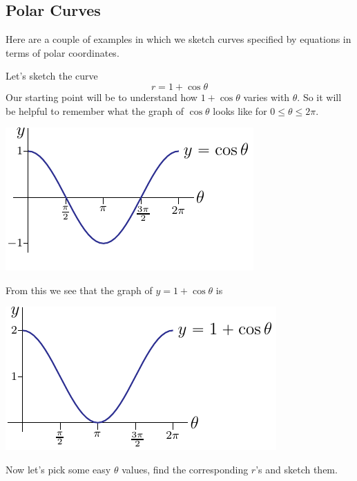 \subsection{Polar Curves} \label{sec polar curves}

Here are a couple of examples in which we sketch curves specified 
by equations in terms of polar coordinates.

\begin{eg}\label{eg cardioid}
Let's sketch the curve 
\begin{equation*}
r= 1+\cos\theta
\end{equation*}
Our starting point will be to understand how $1+\cos\theta$ varies with $\theta$.
So it will be helpful to 
remember what the graph of $\cos\theta$ looks like for $0\le\theta\le 2\pi$.
\begin{efig}
\begin{center}
    \includegraphics{cosGraph.pdf}
\end{center}
\end{efig}
From this we see that the graph of $y=1+\cos\theta$ is 
\begin{efig}
\begin{center}
    \includegraphics{cosGraphP1.pdf}
\end{center}
\end{efig}
Now let's pick some easy $\theta$ values, find the corresponding $r$'s
and sketch them.


\end{eg}
